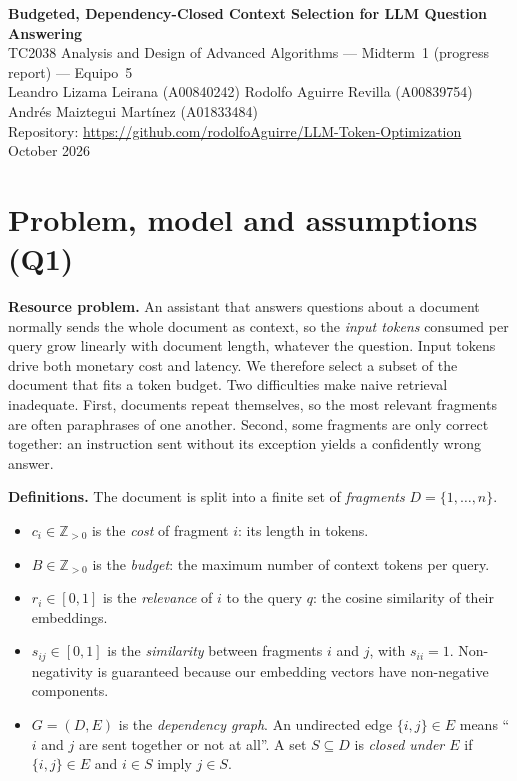\documentclass[10pt,a4paper]{article}
\newcommand{\cost}{c}
\begin{document}
\begin{center}
{\large\bfseries Budgeted, Dependency-Closed Context Selection for LLM Question Answering}\\[0.3em]
TC2038 Analysis and Design of Advanced Algorithms --- Midterm~1 (progress report) --- Equipo~5\\
Leandro Lizama Leirana (A00840242) \quad Rodolfo Aguirre Revilla (A00839754) \quad Andrés Maiztegui Martínez (A01833484)\\
Repository: \url{https://github.com/rodolfoAguirre/LLM-Token-Optimization} \quad October 2026
\end{center}

\section{Problem, model and assumptions (Q1)}

\textbf{Resource problem.} An assistant that answers questions about a document normally sends the whole document as context, so the \emph{input tokens} consumed per query grow linearly with document length, whatever the question. Input tokens drive both monetary cost and latency. We therefore select a subset of the document that fits a token budget. Two difficulties make naive retrieval inadequate. First, documents repeat themselves, so the most relevant fragments are often paraphrases of one another. Second, some fragments are only correct together: an instruction sent without its exception yields a confidently wrong answer.

\textbf{Definitions.} The document is split into a finite set of \emph{fragments} $D=\{1,\dots,n\}$.
\begin{itemize}
\item $\cost_i\in\mathbb{Z}_{>0}$ is the \emph{cost} of fragment $i$: its length in tokens.
\item $B\in\mathbb{Z}_{>0}$ is the \emph{budget}: the maximum number of context tokens per query.
\item $r_i\in[0,1]$ is the \emph{relevance} of $i$ to the query $q$: the cosine similarity of their embeddings.
\item $s_{ij}\in[0,1]$ is the \emph{similarity} between fragments $i$ and $j$, with $s_{ii}=1$. Non-negativity is guaranteed because our embedding vectors have non-negative components.
\item $G=(D,E)$ is the \emph{dependency graph}. An undirected edge $\{i,j\}\in E$ means ``$i$ and $j$ are sent together or not at all''. A set $S\subseteq D$ is \emph{closed under $E$} if $\{i,j\}\in E$ and $i\in S$ imply $j\in S$.
\end{itemize}
\end{document}
